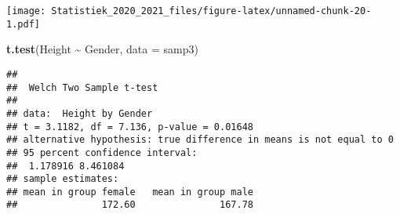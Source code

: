 \documentclass[
  12pt,dutch,coursenotes]{book}
\newenvironment{Shaded}{\begin{snugshade}}{\end{snugshade}}
\newcommand{\DataTypeTok}[1]{\textcolor[rgb]{0.13,0.29,0.53}{#1}}
\newcommand{\DecValTok}[1]{\textcolor[rgb]{0.00,0.00,0.81}{#1}}
\newcommand{\KeywordTok}[1]{\textcolor[rgb]{0.13,0.29,0.53}{\textbf{#1}}}
\newcommand{\NormalTok}[1]{#1}
\newcommand{\OperatorTok}[1]{\textcolor[rgb]{0.81,0.36,0.00}{\textbf{#1}}}
\newcommand{\OtherTok}[1]{\textcolor[rgb]{0.56,0.35,0.01}{#1}}
\newcommand{\StringTok}[1]{\textcolor[rgb]{0.31,0.60,0.02}{#1}}
\theoremstyle{definition}
\theoremstyle{definition}
\theoremstyle{definition}
\theoremstyle{remark}
\begin{document}
\begin{Shaded}
\end{Shaded}

\texttt{[image: Statistiek\_2020\_2021\_files/figure-latex/unnamed-chunk-20-1.pdf]}

\begin{Shaded}
\begin{Highlighting}[]
\KeywordTok{t.test}\NormalTok{(Height }\OperatorTok{\textasciitilde{}}\StringTok{ }\NormalTok{Gender, }\DataTypeTok{data =}\NormalTok{ samp3)}
\end{Highlighting}
\end{Shaded}

\begin{verbatim}
## 
## 	Welch Two Sample t-test
## 
## data:  Height by Gender
## t = 3.1182, df = 7.136, p-value = 0.01648
## alternative hypothesis: true difference in means is not equal to 0
## 95 percent confidence interval:
##  1.178916 8.461084
## sample estimates:
## mean in group female   mean in group male 
##               172.60               167.78
\end{verbatim}
\end{document}
